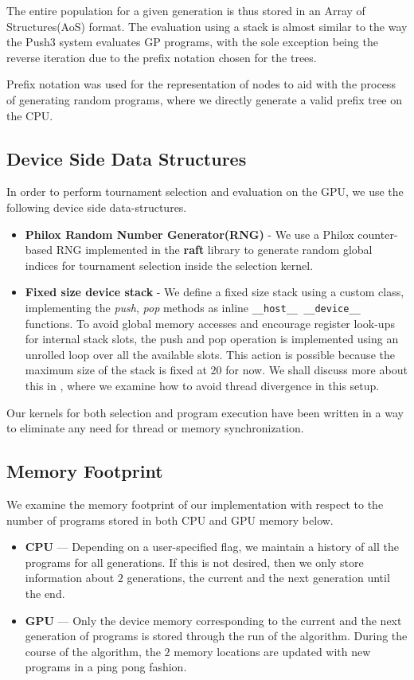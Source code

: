 The entire population for a given generation is thus stored in an Array of Structures(AoS) format. The evaluation using a stack is almost similar to the way the Push3 system \citep{push3Stack} evaluates GP programs, with the sole exception being the reverse iteration due to the prefix notation chosen for the trees. 

Prefix notation was used for the representation of nodes to aid with the process of generating random programs, where we directly generate a valid prefix tree on the CPU.

\subsection{Device Side Data Structures}
\label{ow:deviceds}
In order to perform tournament selection and evaluation on the GPU, we use the following device side data-structures. 
\begin{itemize}
    \item \textbf{Philox Random Number Generator(RNG)} - We use a Philox counter-based RNG\citep{Philox2011} implemented in the {\bf raft} library\citep{raschka2020machine} to generate random global indices for tournament selection inside the selection kernel. 
    \item \textbf{Fixed size device stack} - We define a fixed size stack using a custom class, implementing the \textit{push}, \textit{pop} methods as inline \lstinline!__host__ __device__! functions. To avoid global memory accesses and encourage register look-ups for internal stack slots, the push and pop operation is implemented using an unrolled loop over all the available slots. This action is possible because the maximum size of the stack is fixed at $20$ for now. We shall discuss more about this in , where we examine how to avoid thread divergence in this setup.
\end{itemize}

Our kernels for both selection and program execution have been written in a way to eliminate any need for thread or memory synchronization. 

\subsection{Memory Footprint}
\label{ow:memory}
We examine the memory footprint of our implementation with respect to the number of programs stored in both CPU and GPU memory below. 
\begin{itemize}
    \item \textbf{CPU} --- Depending on a user-specified flag, we maintain a history of all the programs for all generations. If this is not desired, then we only store information about $2$ generations, the current and the next generation until the end.
    \item \textbf{GPU} --- Only the device memory corresponding to the current and the next generation of programs is stored through the run of the algorithm. During the course of the algorithm, the $2$ memory locations are updated with new programs in a ping pong fashion.
\end{itemize}

